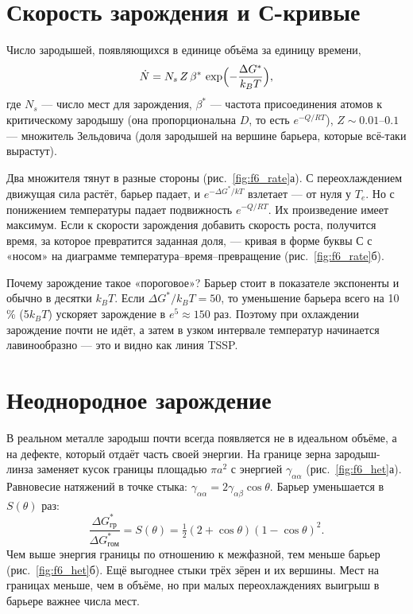 \section{Скорость зарождения и С-кривые}

Число зародышей, появляющихся в единице объёма за единицу времени,
\begin{equation}
\dot N = N_s\,Z\,\beta^*\,\exp\Bigl(-\frac{\Delta G^*}{k_BT}\Bigr),
\end{equation}
где $N_s$ --- число мест для зарождения, $\beta^*$ --- частота присоединения атомов к критическому зародышу
(она пропорциональна $D$, то есть $e^{-Q/RT}$), $Z\sim0.01$--$0.1$ --- множитель Зельдовича (доля зародышей на
вершине барьера, которые всё-таки вырастут).

Два множителя тянут в разные стороны (рис.~\ref{fig:f6_rate}а). С переохлаждением движущая сила растёт, барьер
падает, и $e^{-\Delta G^*/kT}$ взлетает --- от нуля у $T_e$. Но с понижением температуры падает подвижность
$e^{-Q/RT}$. Их произведение имеет максимум. Если к скорости зарождения добавить скорость роста, получится время,
за которое превратится заданная доля, --- кривая в форме буквы С с «носом» на диаграмме
температура--время--превращение (рис.~\ref{fig:f6_rate}б).


\begin{idea}
Почему зарождение такое «пороговое»? Барьер стоит в показателе экспоненты и обычно в десятки $k_BT$. Если
$\Delta G^*/k_BT = 50$, то уменьшение барьера всего на 10\,\% (5$k_BT$) ускоряет зарождение в $e^5\approx150$ раз.
Поэтому при охлаждении зарождение почти не идёт, а затем в узком интервале температур начинается лавинообразно ---
это и видно как линия TSSP.
\end{idea}

\section{Неоднородное зарождение}

В реальном металле зародыш почти всегда появляется не в идеальном объёме, а на дефекте, который отдаёт часть своей
энергии. На границе зерна зародыш-линза заменяет кусок границы площадью $\pi a^2$ с энергией $\gamma_{\alpha\alpha}$
(рис.~\ref{fig:f6_het}а). Равновесие натяжений в точке стыка: $\gamma_{\alpha\alpha} = 2\gamma_{\alpha\beta}\cos\theta$.
Барьер уменьшается в $S(\theta)$ раз:
\begin{equation}
\frac{\Delta G^*_{\text{гр}}}{\Delta G^*_{\text{гом}}} = S(\theta) = \tfrac12(2+\cos\theta)(1-\cos\theta)^2 .
\end{equation}
Чем выше энергия границы по отношению к межфазной, тем меньше барьер (рис.~\ref{fig:f6_het}б). Ещё выгоднее
стыки трёх зёрен и их вершины. Мест на границах меньше, чем в объёме, но при малых переохлаждениях выигрыш в
барьере важнее числа мест.

